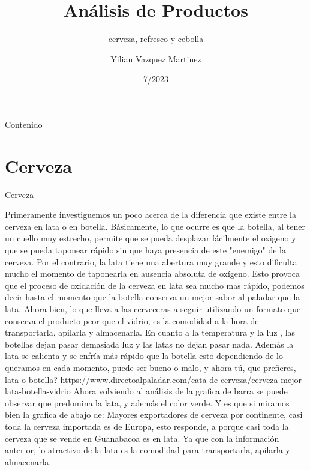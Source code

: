 \documentclass[11pt]{beamer}
\begin{document}
\author[Aprendiendo latex]{Yilian Vazquez Martinez }
\title{Análisis de Productos }
\date{7/2023}
\subtitle{cerveza, refresco y cebolla}


\begin{frame}

    \maketitle

	\end{frame}
	
	\begin{frame}{Contenido}
	    \tableofcontents
	\end{frame}
	\section{ Cerveza}
    	\begin{frame}{ Cerveza}
    		
    	    Primeramente investiguemos un poco acerca de la diferencia que existe entre la cerveza en lata o en botella.
    		Básicamente, lo que ocurre es que la botella, al tener un cuello muy estrecho, permite que se pueda desplazar fácilmente el oxigeno y que se pueda taponear rápido sin que haya presencia de este "enemigo" de la cerveza. Por el contrario, la lata tiene una abertura muy grande y esto dificulta mucho el momento de taponearla en ausencia absoluta de oxígeno. Esto provoca que el proceso de oxidación de la cerveza en lata sea mucho mas rápido, podemos decir hasta el momento que la botella conserva un mejor sabor al paladar que la lata. Ahora bien, lo que lleva a las cerveceras a seguir utilizando un formato que conserva el producto peor que el vidrio, es la comodidad a la hora de transportarla, apilarla y almacenarla. En cuanto a la temperatura y la luz , las botellas dejan pasar demasiada luz y las latas no dejan pasar nada. Además la lata se calienta y se enfría más rápido que la botella esto dependiendo de lo queramos en cada momento, puede ser bueno o malo, y ahora tú, que prefieres,  lata o botella?
    	    https://www.directoalpaladar.com/cata-de-cerveza/cerveza-mejor-lata-botella-vidrio
    		Ahora volviendo al análisis de la grafica de barra se puede observar que predomina la lata, y además el color verde. Y es que si miramos bien la grafica de abajo de: Mayores exportadores de cerveza por continente, casi toda la cerveza importada es de Europa, esto responde, a porque casi toda la cerveza que se vende en Guanabacoa es en lata. Ya que con la información anterior, lo atractivo de la lata es la comodidad para transportarla, apilarla y almacenarla.
        \end{frame}
    
\end{document}
